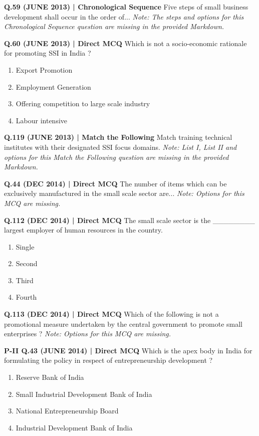 \documentclass{article}
\begin{document}
\textbf{Q.59 (JUNE 2013) | Chronological Sequence}
Five steps of small business development shall occur in the order of...
\emph{Note: The steps and options for this Chronological Sequence question are missing in the provided Markdown.}

\textbf{Q.60 (JUNE 2013) | Direct MCQ}
Which is not a socio-economic rationale for promoting SSI in India ?
\begin{enumerate}[label=(\arabic*)]
    \item Export Promotion
    \item Employment Generation
    \item Offering competition to large scale industry
    \item Labour intensive
\end{enumerate}

\textbf{Q.119 (JUNE 2013) | Match the Following}
Match training technical institutes with their designated SSI focus domains.
\emph{Note: List I, List II and options for this Match the Following question are missing in the provided Markdown.}

\textbf{Q.44 (DEC 2014) | Direct MCQ}
The number of items which can be exclusively manufactured in the small scale sector are...
\emph{Note: Options for this MCQ are missing.}

\textbf{Q.112 (DEC 2014) | Direct MCQ}
The small scale sector is the ________ largest employer of human resources in the country.
\begin{enumerate}[label=(\arabic*)]
    \item Single
    \item Second
    \item Third
    \item Fourth
\end{enumerate}

\textbf{Q.113 (DEC 2014) | Direct MCQ}
Which of the following is not a promotional measure undertaken by the central government to promote small enterprises ?
\emph{Note: Options for this MCQ are missing.}

\textbf{P-II Q.43 (JUNE 2014) | Direct MCQ}
Which is the apex body in India for formulating the policy in respect of entrepreneurship development ?
\begin{enumerate}[label=(\arabic*)]
    \item Reserve Bank of India
    \item Small Industrial Development Bank of India
    \item National Entrepreneurship Board
    \item Industrial Development Bank of India
\end{enumerate}
\end{document}
